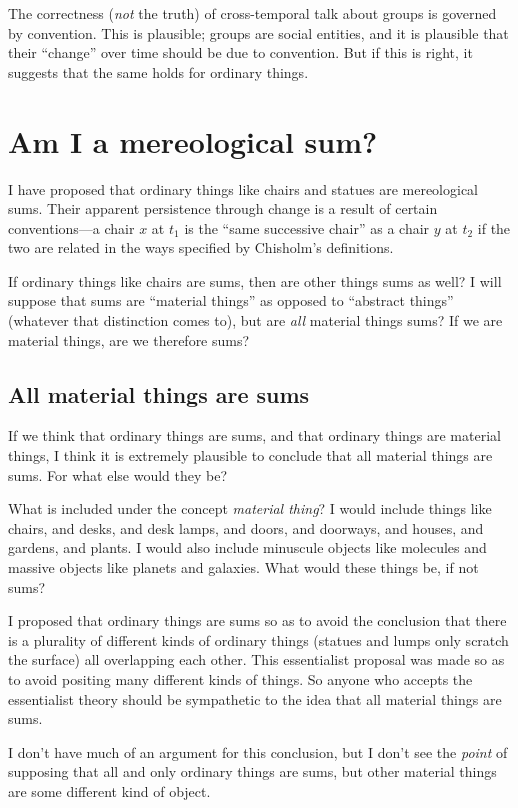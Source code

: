 \documentclass[11pt]{article}
\begin{document}
\begin{spacing}{1.5}
The correctness ({\em not} the truth) of cross-temporal talk about
groups is governed by convention.  This is plausible; groups are
social entities, and it is plausible that their ``change'' over time
should be due to convention.  But if this is right, it suggests that
the same holds for ordinary things.

\section{Am I a mereological sum?}
\label{i-sum}
I have proposed that ordinary things like chairs and statues are
mereological sums.  Their apparent persistence through change is a
result of certain conventions---a chair $x$ at $t_1$ is the ``same
successive chair'' as a chair $y$ at $t_2$ if the two are related in
the ways specified by Chisholm's definitions.

If ordinary things like chairs are sums, then are other things sums as
well?  I will suppose that sums are ``material things'' as opposed to
``abstract things'' (whatever that distinction comes to), but are {\em
  all} material things sums?  If we are material things, are we
therefore sums?

\subsection{All material things are sums}
\label{material-sum}
If we think that ordinary things are sums, and that ordinary things
are material things, I think it is extremely plausible to conclude
that all material things are sums.  For what else would they be?

What is included under the concept {\em material thing}?  I would
include things like chairs, and desks, and desk lamps, and doors, and
doorways, and houses, and gardens, and plants.  I would also include
minuscule objects like molecules and massive objects like planets and
galaxies.  What would these things be, if not sums?

I proposed that ordinary things are sums so as to avoid the conclusion
that there is a plurality of different kinds of ordinary things
(statues and lumps only scratch the surface) all overlapping each
other.  This essentialist proposal was made so as to avoid positing
many different kinds of things.  So anyone who accepts the
essentialist theory should be sympathetic to the idea that all
material things are sums.

I don't have much of an argument for this conclusion, but I don't see
the {\em point} of supposing that all and only ordinary things are
sums, but other material things are some different kind of object.


\end{spacing}
\end{document}
